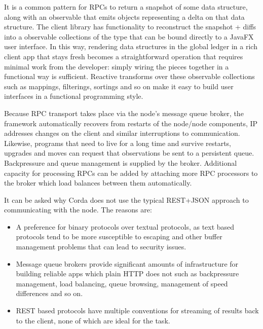 \documentclass{article}
\begin{document}
It is a common pattern for RPCs to return a snapshot of some data structure, along with an observable that emits
objects representing a delta on that data structure. The client library has functionality to reconstruct the
snapshot + diffs into a observable collections of the type that can be bound directly to a JavaFX user interface.
In this way, rendering data structures in the global ledger in a rich client app that stays fresh becomes a
straightforward operation that requires minimal work from the developer: simply wiring the pieces together in
a functional way is sufficient. Reactive transforms over these observable collections such as mappings,
filterings, sortings and so on make it easy to build user interfaces in a functional programming style.

Because RPC transport takes place via the node's message queue broker, the framework automatically recovers
from restarts of the node/node components, IP addresses changes on the client and similar interruptions to
communication. Likewise, programs that need to live for a long time and survive restarts, upgrades and moves
can request that observations be sent to a persistent queue. Backpressure and queue management is supplied by
the broker. Additional capacity for processing RPCs can be added by attaching more RPC processors to the broker
which load balances between them automatically.

It can be asked why Corda does not use the typical REST+JSON approach to communicating with the node. The reasons
are:

\begin{itemize}
\item A preference for binary protocols over textual protocols, as text based protocols tend to be more
susceptible to escaping and other buffer management problems that can lead to security issues.
\item Message queue brokers provide significant amounts of infrastructure for building reliable apps
which plain HTTP does not such as backpressure management, load balancing, queue browsing, management of speed
differences and so on.
\item REST based protocols have multiple conventions for streaming of results back to the client, none of which
are ideal for the task.
\end{itemize}

\end{document}

